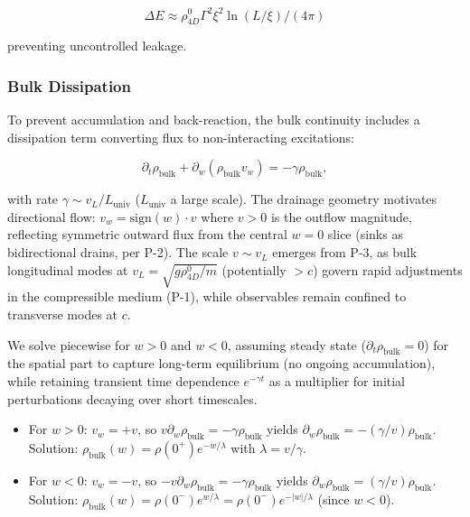 \begin{equation}
\Delta E \approx \rho_{4D}^0 \Gamma^2 \xi^2 \ln(L / \xi) / (4\pi)
\end{equation}

preventing uncontrolled leakage.

\subsubsection{Bulk Dissipation}
To prevent accumulation and back-reaction, the bulk continuity includes a dissipation term converting flux to non-interacting excitations:

\begin{equation}
\partial_t \rho_{\text{bulk}} + \partial_w (\rho_{\text{bulk}} v_w) = -\gamma \rho_{\text{bulk}},
\end{equation}

with rate $\gamma \sim v_L / L_{\text{univ}}$ ($L_{\text{univ}}$ a large scale). The drainage geometry motivates directional flow: $v_w = \text{sign}(w) \cdot v$ where $v > 0$ is the outflow magnitude, reflecting symmetric outward flux from the central $w=0$ slice (sinks as bidirectional drains, per P-2). The scale $v \sim v_L$ emerges from P-3, as bulk longitudinal modes at $v_L = \sqrt{g \rho_{4D}^0 / m}$ (potentially $> c$) govern rapid adjustments in the compressible medium (P-1), while observables remain confined to transverse modes at $c$.

We solve piecewise for $w > 0$ and $w < 0$, assuming steady state ($\partial_t \rho_{\text{bulk}} = 0$) for the spatial part to capture long-term equilibrium (no ongoing accumulation), while retaining transient time dependence $e^{-\gamma t}$ as a multiplier for initial perturbations decaying over short timescales.

\begin{itemize}
\item For $w > 0$: $v_w = +v$, so $v \partial_w \rho_{\text{bulk}} = -\gamma \rho_{\text{bulk}}$ yields $\partial_w \rho_{\text{bulk}} = -(\gamma / v) \rho_{\text{bulk}}$. Solution: $\rho_{\text{bulk}}(w) = \rho(0^+) e^{-w / \lambda}$ with $\lambda = v / \gamma$.
\item For $w < 0$: $v_w = -v$, so $-v \partial_w \rho_{\text{bulk}} = -\gamma \rho_{\text{bulk}}$ yields $\partial_w \rho_{\text{bulk}} = (\gamma / v) \rho_{\text{bulk}}$. Solution: $\rho_{\text{bulk}}(w) = \rho(0^-) e^{w / \lambda} = \rho(0^-) e^{-|w| / \lambda}$ (since $w < 0$).
\end{itemize}

